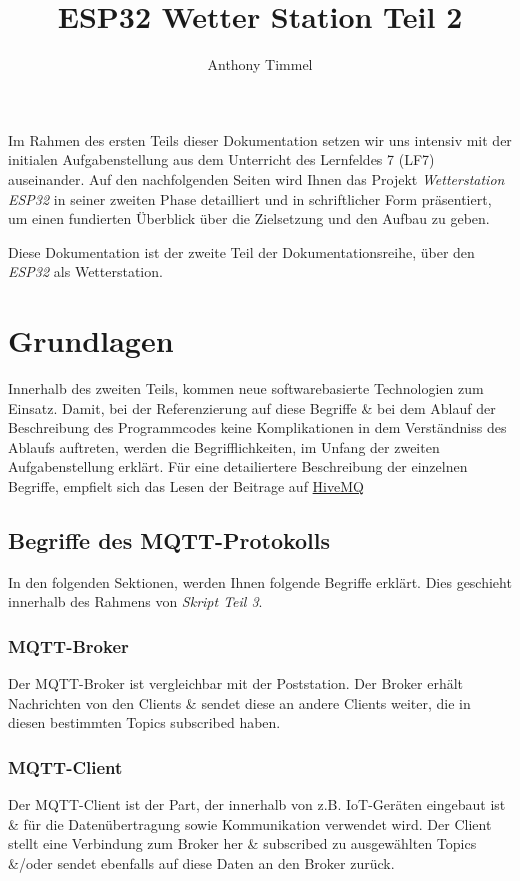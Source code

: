 \documentclass[9pt,a4paper]{report}
\title{ESP32 Wetter Station Teil 2}
\author{Anthony Timmel}
\begin{document}
	\maketitle
	\tableofcontents
	\cleardoublepage
	
	Im Rahmen des ersten Teils dieser Dokumentation setzen wir uns intensiv mit der initialen Aufgabenstellung aus dem Unterricht des Lernfeldes 7 (LF7) auseinander. Auf den nachfolgenden Seiten wird Ihnen das Projekt \textit{Wetterstation ESP32} in seiner zweiten Phase detailliert und in schriftlicher Form präsentiert, um einen fundierten Überblick über die Zielsetzung und den Aufbau zu geben.
	
	Diese Dokumentation ist der zweite Teil der Dokumentationsreihe, über den \textit{ESP32} als Wetterstation.
	
	\chapter{Grundlagen}
	Innerhalb des zweiten Teils, kommen neue softwarebasierte Technologien zum Einsatz. Damit, bei der Referenzierung auf diese Begriffe \& bei dem Ablauf der Beschreibung des Programmcodes keine Komplikationen in dem Verständniss des Ablaufs auftreten, werden die Begrifflichkeiten, im Unfang der zweiten Aufgabenstellung erklärt.
	Für eine detailiertere Beschreibung der einzelnen Begriffe, empfielt sich das Lesen der Beitrage auf \hyperref{https://www.hivemq.com}{hivemq}{HiveMQ}{HiveMQ}
	
	\section{Begriffe des MQTT-Protokolls}
	In den folgenden Sektionen, werden Ihnen folgende Begriffe erklärt. Dies geschieht innerhalb des Rahmens von \textit{Skript Teil 3}.
	
	\subsection{MQTT-Broker}
	Der MQTT-Broker ist vergleichbar mit der Poststation. Der Broker erhält Nachrichten von den Clients \& sendet diese an andere Clients weiter, die in diesen bestimmten Topics subscribed haben.
	
	\subsection{MQTT-Client}
	Der MQTT-Client ist der Part, der innerhalb von z.B. IoT-Geräten eingebaut ist \& für die Datenübertragung sowie Kommunikation verwendet wird. Der Client stellt eine Verbindung zum Broker her \& subscribed zu ausgewählten Topics \&/oder sendet ebenfalls auf diese Daten an den Broker zurück.
	
\end{document}
